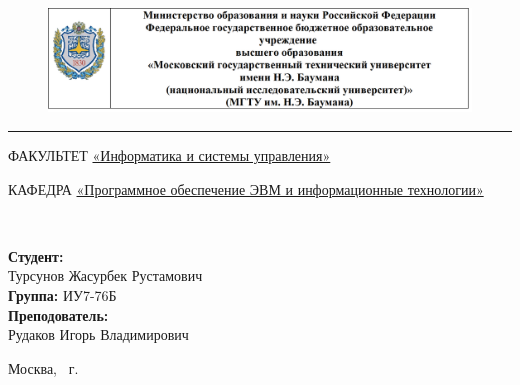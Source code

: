 \documentclass[a4paper, 12pt]{article}
\begin{document}
	
\begin{titlepage}
	\fontsize{12pt}{12pt}\selectfont
	\begin{figure}[t!]
		\centering
		\includegraphics[scale=0.8]{bmstu}
	\end{figure}
	
	\noindent\rule{15cm}{3pt}
	\newline\newline
	\noindent 
	ФАКУЛЬТЕТ 
	\underline{«Информатика и системы управления»} \newline
	
	\noindent КАФЕДРА \underline{«Программное обеспечение ЭВМ и информационные технологии»}\newline\newline\newline\newline\newline
	
	\vspace{4mm}
	
	\\ 
	\vspace{20mm}
	
	
	\begin{flushright}
		{\small	\textbf{Студент:}\\ Турсунов Жасурбек Рустамович \\ \textbf{Группа:} ИУ7-76Б
			\vspace{3mm}
			\\\textbf{Преподователь:} \\ Рудаков Игорь Владимирович }
	\end{flushright}
	
	\begin{center}
		\vfill
		Москва, \the\year
		~г.
	\end{center}
\end{titlepage}
\end{document}
